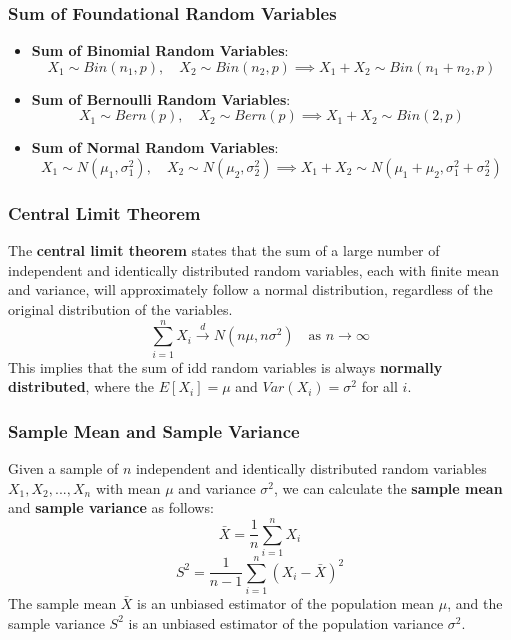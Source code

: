 \subsubsection{Sum of Foundational Random Variables}
\begin{itemize}
    \item \textbf{Sum of Binomial Random Variables}: 
    \[
        X_1 \sim Bin(n_1, p), \quad X_2 \sim Bin(n_2, p) \implies X_1 + X_2 \sim Bin(n_1 + n_2, p)
    \]
    \item \textbf{Sum of Bernoulli Random Variables}:
    \[
        X_1 \sim Bern(p), \quad X_2 \sim Bern(p) \implies X_1 + X_2 \sim Bin(2, p)
    \]
    \item \textbf{Sum of Normal Random Variables}:
    \[
        X_1 \sim N(\mu_1, \sigma_1^2), \quad X_2 \sim N(\mu_2, \sigma_2^2) \implies X_1 + X_2 \sim N(\mu_1 + \mu_2, \sigma_1^2 + \sigma_2^2)
    \]
\end{itemize}

\subsubsection{Central Limit Theorem}
The \textbf{central limit theorem} states that the sum of a large number of independent and identically distributed random variables, each with finite mean and variance, will approximately follow a normal distribution, regardless of the original distribution of the variables.
\[
    \sum_{i=1}^{n} X_i \xrightarrow{d} N(n\mu, n\sigma^2) \quad \text{as } n \to \infty
\]
This implies that the sum of idd random variables is always \textbf{normally distributed}, where the $E[X_i] = \mu$ and $Var(X_i) = \sigma^2$ for all $i$.

\subsubsection{Sample Mean and Sample Variance}
Given a sample of $n$ independent and identically distributed random variables $X_1, X_2, ..., X_n$ with mean $\mu$ and variance $\sigma^2$, we can calculate the \textbf{sample mean} and \textbf{sample variance} as follows:
\begin{equation}
    \bar{X} = \frac{1}{n} \sum_{i=1}^{n} X_i
\end{equation}
\begin{equation}
    S^2 = \frac{1}{n-1} \sum_{i=1}^{n} (X_i - \bar{X})^2
\end{equation}
The sample mean $\bar{X}$ is an unbiased estimator of the population mean $\mu$, and the sample variance $S^2$ is an unbiased estimator of the population variance $\sigma^2$.

